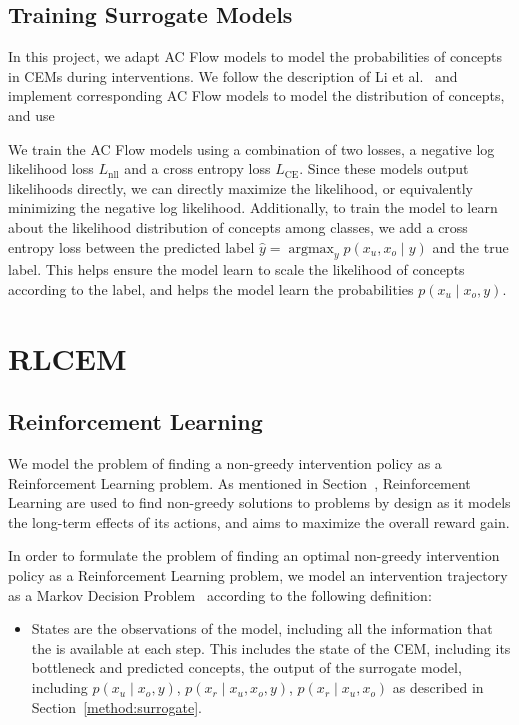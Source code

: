 \documentclass[../main.tex]{subfiles}
\begin{document}
\subsection{Training Surrogate Models}

In this project, we adapt AC Flow models to model the probabilities of concepts in CEMs during interventions.
We follow the description of Li et al.~\cite{afa} and implement corresponding AC Flow models to model
the distribution of concepts, and use 

We train the AC Flow models using a combination of two losses, a negative
log likelihood loss $L_{\text{nll}}$ and a cross entropy loss $L_{\text{CE}}$. 
Since these models output likelihoods directly,
we can directly maximize the likelihood, or equivalently minimizing the negative log likelihood.
Additionally, to train the model to learn about the likelihood distribution of concepts
among classes, we add a cross entropy loss between the predicted label $\hat{y} = \mathop{\mathrm{argmax}}_y p(x_u, x_o \mid y)$ and the
true label. This helps ensure the model learn to scale the likelihood of concepts according to the 
label, and helps the model learn the probabilities $p(x_u \mid x_o, y)$.

\section{RLCEM}\label{method:rlcem}


\subsection{Reinforcement Learning}

We model the problem of finding a non-greedy intervention policy as a 
Reinforcement Learning problem. As mentioned in Section~\cite{background:rl},
Reinforcement Learning are used to find non-greedy solutions to problems
by design as it models the long-term effects of its actions, and aims to 
maximize the overall reward gain. 

In order to formulate the problem of finding an optimal non-greedy intervention policy
as a Reinforcement Learning problem, we model an intervention
trajectory as a Markov Decision Problem~\cite{rl-mdp} according
to the following definition:
\begin{itemize}
    \item States are the observations of the model, including all the information that the is available
    at each step. This includes the state of the CEM, including its bottleneck and predicted concepts,
    the output of the surrogate model, including $p(x_u \mid x_o, y)$, $p(x_r \mid x_u, x_o, y)$,
    $p(x_r \mid x_u, x_o)$ as described in Section~\ref{method:surrogate}.
\end{itemize}
\end{document}
